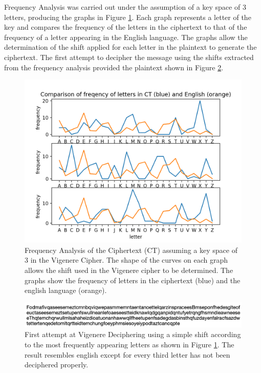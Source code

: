 \documentclass[a4paper,11pt]{article}
\begin{document}
	Frequency Analysis was carried out under the assumption of a key space of 3 letters, producing the graphs in Figure \ref{q1freq}. Each graph represents a letter of the key and compares the frequency of the letters in the ciphertext to that of the frequency of a letter appearing in the English language. The graphs allow the determination of the shift applied for each letter in the plaintext to generate the ciphertext. The first attempt to decipher the message using the shifts extracted from the frequency analysis provided the plaintext shown in Figure \ref{q1attempt}.

		\begin{figure}[h]
			\centering
			\includegraphics[width = 12cm]{img/q1freq}
			\captionsetup{width = 13cm}
			\caption{Frequency Analysis of the Ciphertext (CT) assuming a key space of 3 in the Vigenere Cipher. The shape of the curves on each graph allows the shift used in the Vigenere cipher to be determined. The graphs show the frequency of letters in the ciphertext (blue) and the english language (orange).}
			\label{q1freq}
		\end{figure}
		
		\begin{figure}[h]
			\centering
			\includegraphics[width = 15cm]{img/q1attempt}
			\captionsetup{width = 13cm}
			\caption{First attempt at Vigenere Deciphering using a simple shift according to the most frequently appearing letters as shown in Figure \ref{q1freq}. The result resembles english except for every third letter has not been deciphered properly.}
			\label{q1attempt}
		\end{figure}	
		
\end{document}
